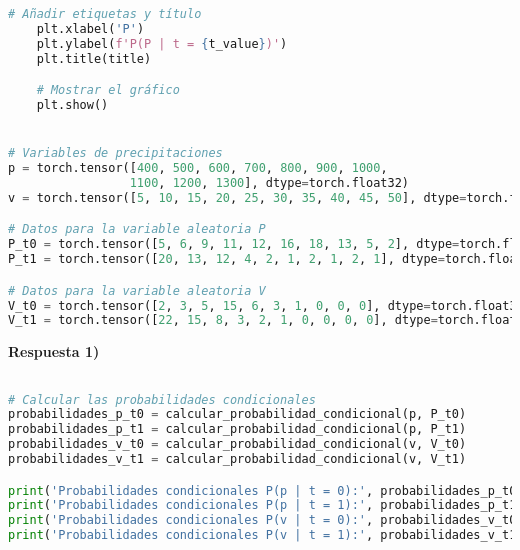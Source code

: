 \documentclass[spanish]{article}
\begin{document}
\begin{lstlisting}[language=Python, caption=Implementación de Funciones]
    # Añadir etiquetas y título
    plt.xlabel('P')
    plt.ylabel(f'P(P | t = {t_value})')
    plt.title(title)

    # Mostrar el gráfico
    plt.show()


# Variables de precipitaciones
p = torch.tensor([400, 500, 600, 700, 800, 900, 1000,
                 1100, 1200, 1300], dtype=torch.float32)
v = torch.tensor([5, 10, 15, 20, 25, 30, 35, 40, 45, 50], dtype=torch.float32)

# Datos para la variable aleatoria P
P_t0 = torch.tensor([5, 6, 9, 11, 12, 16, 18, 13, 5, 2], dtype=torch.float32)
P_t1 = torch.tensor([20, 13, 12, 4, 2, 1, 2, 1, 2, 1], dtype=torch.float32)

# Datos para la variable aleatoria V
V_t0 = torch.tensor([2, 3, 5, 15, 6, 3, 1, 0, 0, 0], dtype=torch.float32)
V_t1 = torch.tensor([22, 15, 8, 3, 2, 1, 0, 0, 0, 0], dtype=torch.float32)

\end{lstlisting}
\newpage
\vspace{15px}
\textbf{Respuesta 1)}




\begin{lstlisting}[language=Python, caption=Calculo Probabilidades]

# Calcular las probabilidades condicionales
probabilidades_p_t0 = calcular_probabilidad_condicional(p, P_t0)
probabilidades_p_t1 = calcular_probabilidad_condicional(p, P_t1)
probabilidades_v_t0 = calcular_probabilidad_condicional(v, V_t0)
probabilidades_v_t1 = calcular_probabilidad_condicional(v, V_t1)

print('Probabilidades condicionales P(p | t = 0):', probabilidades_p_t0)
print('Probabilidades condicionales P(p | t = 1):', probabilidades_p_t1)
print('Probabilidades condicionales P(v | t = 0):', probabilidades_v_t0)
print('Probabilidades condicionales P(v | t = 1):', probabilidades_v_t1)
\end{lstlisting}
\end{document}
